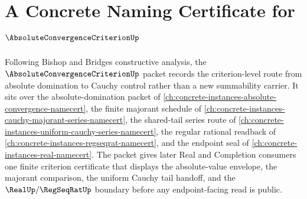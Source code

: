 \chapter{A Concrete Naming Certificate for $\AbsoluteConvergenceCriterionUp$}
\label{ch:concrete-instances-absolute-convergence-criterion-namecert}

Following Bishop and Bridges constructive analysis, the $\AbsoluteConvergenceCriterionUp$ packet records the criterion-level route from absolute domination to Cauchy control rather than a new summability carrier. It sits over the absolute-domination packet of \autoref{ch:concrete-instances-absolute-convergence-namecert}, the finite majorant schedule of \autoref{ch:concrete-instances-cauchy-majorant-series-namecert}, the shared-tail series route of \autoref{ch:concrete-instances-uniform-cauchy-series-namecert}, the regular rational readback of \autoref{ch:concrete-instances-regseqrat-namecert}, and the endpoint seal of \autoref{ch:concrete-instances-real-namecert}. The packet gives later Real and Completion consumers one finite criterion certificate that displays the absolute-value envelope, the majorant comparison, the uniform Cauchy tail handoff, and the $\RealUp/\RegSeqRatUp$ boundary before any endpoint-facing read is public.


